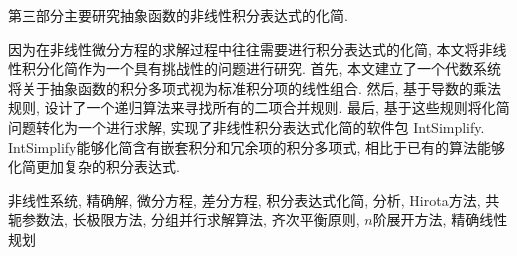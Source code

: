 第三部分主要研究抽象函数的非线性积分表达式的化简.

因为在非线性微分方程的求解过程中往往需要进行积分表达式的化简, 本文将非线性积分化简作为一个具有挑战性的问题进行研究. 首先, 本文建立了一个代数系统将关于抽象函数的积分多项式视为标准积分项的线性组合. 然后, 基于导数的乘法规则, 设计了一个递归算法来寻找所有的二项合并规则. 最后, 基于这些规则将化简问题转化为一个进行求解, 实现了非线性积分表达式化简的软件包 IntSimplify.  IntSimplify能够化简含有嵌套积分和冗余项的积分多项式, 相比于已有的算法能够化简更加复杂的积分表达式. 

\bigskip

非线性系统, 精确解, 微分方程, 差分方程, 积分表达式化简, \Painleve{}分析, Hirota方法, 共轭参数法, 长极限方法, 分组并行求解算法, 齐次平衡原则, $n$阶展开方法, 精确线性规划
